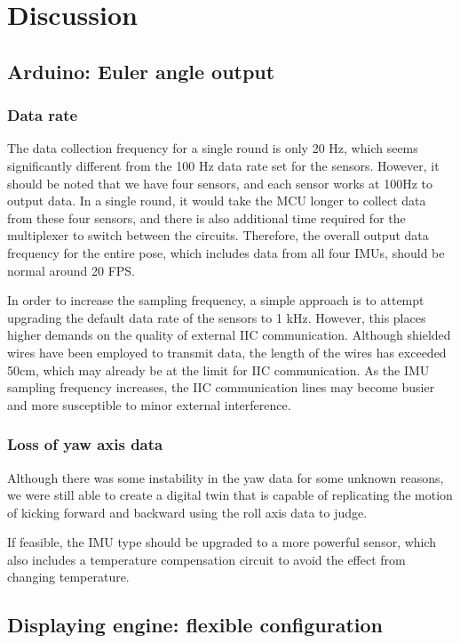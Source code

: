 \chapter{Discussion}


\section{Arduino:  Euler angle output}
\subsection{Data rate}
The data collection frequency for a single round is only 20 Hz, which seems significantly different from the 100 Hz data rate set for the sensors.
However, it should be noted that we have four sensors, and each sensor works at 100Hz to output data.
In a single round, it would take the MCU longer to collect data from these four sensors, and there is also additional time required for the multiplexer to switch between the circuits.
Therefore, the overall output data frequency for the entire pose, which includes data from all four IMUs, should be normal around 20 FPS\@.

In order to increase the sampling frequency, a simple approach is to attempt upgrading the default data rate of the sensors to 1 kHz. However, this places higher demands on the quality of external IIC communication.
Although shielded wires have been employed to transmit data, the length of the wires has exceeded 50cm, which may already be at the limit for IIC communication.
As the IMU sampling frequency increases, the IIC communication lines may become busier and more susceptible to minor external interference.

\subsection{Loss of yaw axis data}

Although there was some instability in the yaw data for some unknown reasons, we were still able to create a digital twin that is capable of replicating the motion of kicking forward and backward using the roll axis data to judge.

If feasible, the IMU type should be upgraded to a more powerful sensor, which also includes a temperature compensation circuit to avoid the effect from changing temperature.

\section{Displaying engine: flexible configuration}

